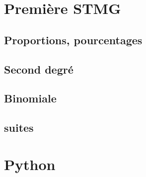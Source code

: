 \part{Première STMG}
\chapter{Proportions, pourcentages}


\chapter{Second degré}


\chapter{Binomiale}




\chapter{suites}



\part{Python}


%







\printnomenclature

\printindex



